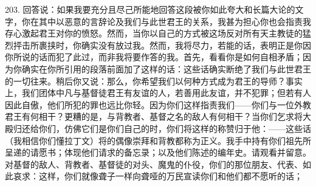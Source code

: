 203. 回答说：如果我要充分且尽己所能地回答这段被你如此夸大和长篇大论的文字，你在其中以恶意的言辞论及我们与此世君王的关系，我甚为担心你也会指责我存心激起君王对你的愤怒。然而，当你以自己的方式被这场反对所有天主教徒的猛烈抨击所裹挟时，你确实没有放过我。然而，我将尽力，若能的话，表明正是你因你所说的话而犯了此过，而非我将要作答的我。首先，看看你是如何自相矛盾；因为你确实在你所引用的段落前面加了这样的话：这些话确实断绝了我们与此世君王的一切往来。稍后你又说：那么，你希望我们以何种方式成为君王的导师？事实上，我们团体中凡与基督徒君王有友谊的人，若善用此友谊，并不犯罪；但若有人因此自傲，他们所犯的罪也远比你轻。因为你们这样指责我们——你们与一位外教君王有何相干？更糟的是，与背教者、基督之名的敌人有何相干？当你们乞求将大殿归还给你们，仿佛它们是你们自己的时，你们将这样的称赞归于他：——这些话（我相信你们懂拉丁文）将的偶像崇拜和背教都称为正义。我手中持有你们祖先所呈递的请愿书；体现他们请求的备忘录；以及他们陈述的编年史。请观看并留意。对基督的敌人、背教者、基督徒的对头、魔鬼的仆役，你们的那位朋友、代表、如此哀求：这样，你们就像聋子一样向聋哑的万民宣读你们和他们都不愿听的话；\par

